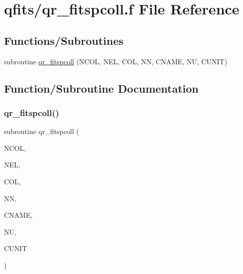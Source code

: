 \hypertarget{qr__fitspcoll_8f}{}\section{qfits/qr\+\_\+fitspcoll.f File Reference}
\label{qr__fitspcoll_8f}
\subsection*{Functions/\+Subroutines}
\begin{DoxyCompactItemize}
\item 
subroutine \hyperlink{qr__fitspcoll_8f_a6194245d6a4098c846c12b01e26692e1}{qr\+\_\+fitspcoll} (N\+C\+OL, N\+EL, C\+OL, NN, C\+N\+A\+ME, NU, C\+U\+N\+IT)
\end{DoxyCompactItemize}


\subsection{Function/\+Subroutine Documentation}
\mbox{\label{qr__fitspcoll_8f_a6194245d6a4098c846c12b01e26692e1}} 
\subsubsection{\texorpdfstring{qr\+\_\+fitspcoll()}{qr\_fitspcoll()}}
{\footnotesize\ttfamily subroutine qr\+\_\+fitspcoll (\begin{DoxyParamCaption}\item[{integer}]{N\+C\+OL,  }\item[{integer}]{N\+EL,  }\item[{integer, dimension(nel)}]{C\+OL,  }\item[{integer}]{NN,  }\item[{character$\ast$(nn)}]{C\+N\+A\+ME,  }\item[{integer}]{NU,  }\item[{character$\ast$(nu)}]{C\+U\+N\+IT }\end{DoxyParamCaption})}

